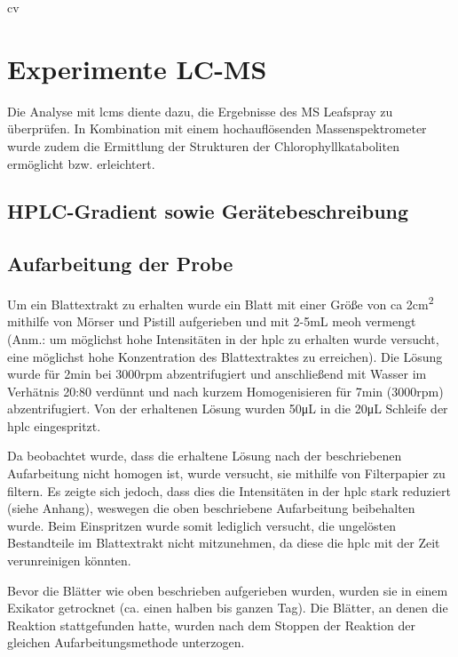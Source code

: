 cv\chapter{Experimente LC-MS} 

Die Analyse mit \gls{lcms} diente dazu, die Ergebnisse des MS Leafspray zu überprüfen. In Kombination mit einem hochauflösenden Massenspektrometer wurde zudem die Ermittlung der Strukturen der Chlorophyllkataboliten ermöglicht bzw. erleichtert.\\

\section{HPLC-Gradient sowie Gerätebeschreibung} \label{sec:HPLCAufarbeitungderProbe} 

\section{Aufarbeitung der Probe} \label{sec:HPLCAufarbeitungderProbe}

Um ein Blattextrakt zu erhalten wurde ein Blatt mit einer Größe von \gls{ca} 2\si{cm^{2}} mithilfe von Mörser und Pistill aufgerieben und mit 2-5mL \gls{meoh} vermengt (Anm.: um möglichst hohe Intensitäten in der \gls{hplc} zu erhalten wurde versucht, eine möglichst hohe Konzentration des Blattextraktes zu erreichen). Die Lösung wurde für 2min bei 3000rpm abzentrifugiert und anschließend mit Wasser im Verhätnis 20:80 verdünnt und nach kurzem Homogenisieren für 7min (3000rpm) abzentrifugiert. Von der erhaltenen Lösung wurden 50\si{\uL} in die 20\si{\uL} Schleife der \gls{hplc} eingespritzt. 

Da beobachtet wurde, dass die erhaltene Lösung nach der beschriebenen Aufarbeitung nicht homogen ist, wurde versucht, sie mithilfe von Filterpapier zu filtern. Es zeigte sich jedoch, dass dies die Intensitäten in der \gls{hplc} stark reduziert (siehe Anhang), weswegen die oben beschriebene Aufarbeitung beibehalten wurde. Beim Einspritzen wurde somit lediglich versucht, die ungelösten Bestandteile im Blattextrakt nicht mitzunehmen, da diese die \gls{hplc} mit der Zeit verunreinigen könnten.

Bevor die Blätter wie oben beschrieben aufgerieben wurden, wurden sie in einem Exikator getrocknet (ca. einen halben bis ganzen Tag). Die Blätter, an denen die Reaktion stattgefunden hatte, wurden nach dem Stoppen der Reaktion  der gleichen Aufarbeitungsmethode unterzogen. 

